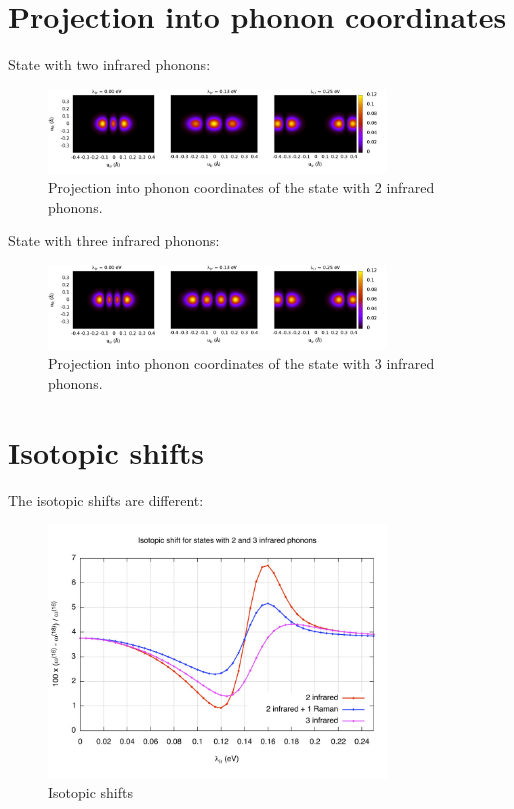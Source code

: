 \section{Projection into phonon coordinates}

State with two infrared phonons:

\begin{figure}[ht!]
  \centering
  \includegraphics[width=0.8\textwidth]{images/ph-second_infrared.png}
  \caption{Projection into phonon coordinates of the state with 2 infrared phonons.}
  \label{fig:ph-second_infrared}
\end{figure}

State with three infrared phonons:

\begin{figure}[ht!]
  \centering
  \includegraphics[width=0.8\textwidth]{images/ph-third_infrared.png}
  \caption{Projection into phonon coordinates of the state with 3 infrared phonons.}
  \label{fig:ph-third_infrared}
\end{figure}

\section{Isotopic shifts}

The isotopic shifts are different:

\begin{figure}[ht!]
  \centering
  \includegraphics[width=0.8\textwidth]{images/isot-2_3ir.jpg}
  \caption{Isotopic shifts}
  \label{fig:isot-2_3ir}
\end{figure}
